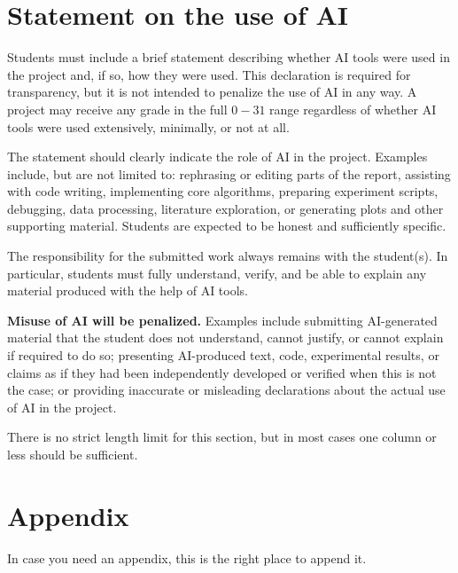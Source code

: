 \documentclass{article}
\begin{document}
\section{Statement on the use of AI}\label{sec:ai}
%
Students must include a brief statement describing whether AI tools were used in the project and, if so, how they were used. This declaration is required for transparency, but it is not intended to penalize the use of AI in any way. A project may receive any grade in the full $0 - 31$ range regardless of whether AI tools were used extensively, minimally, or not at all.

The statement should clearly indicate the role of AI in the project. Examples include, but are not limited to: rephrasing or editing parts of the report, assisting with code writing, implementing core algorithms, preparing experiment scripts, debugging, data processing, literature exploration, or generating plots and other supporting material. Students are expected to be honest and sufficiently specific.

The responsibility for the submitted work always remains with the student(s). In particular, students must fully understand, verify, and be able to explain any material produced with the help of AI tools.

\textbf{Misuse of AI will be penalized.} Examples include submitting AI-generated material that the student does not understand, cannot justify, or cannot explain if required to do so; presenting AI-produced text, code, experimental results, or claims as if they had been independently developed or verified when this is not the case; or providing inaccurate or misleading declarations about the actual use of AI in the project.

There is no strict length limit for this section, but in most cases one column or less should be sufficient.





\section*{Appendix}
%
In case you need an appendix, this is the right place to append it.
\end{document}
